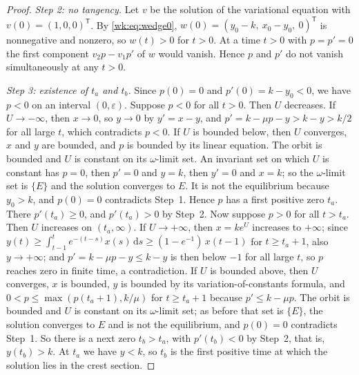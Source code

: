 \begin{proof}
\emph{Step 2: no tangency.} Let $v$ be the solution of the variational equation with $v(0)=(1,0,0)^{\mathsf T}$. By \eqref{wk:eq:wedge0}, $w(0)=(y_0-k,\ x_0-y_0,\ 0)^{\mathsf T}$ is nonnegative and nonzero, so $w(t)>0$ for $t>0$. At a time $t>0$ with $p=p'=0$ the first component $v_2p-v_1p'$ of $w$ would vanish. Hence $p$ and $p'$ do not vanish simultaneously at any $t>0$.

\emph{Step 3: existence of $t_a$ and $t_b$.} Since $p(0)=0$ and $p'(0)=k-y_0<0$, we have $p<0$ on an interval $(0,\varepsilon)$. Suppose $p<0$ for all $t>0$. Then $U$ decreases. If $U\to-\infty$, then $x\to0$, so $y\to0$ by $y'=x-y$, and $p'=k-\mu p-y>k-y>k/2$ for all large $t$, which contradicts $p<0$. If $U$ is bounded below, then $U$ converges, $x$ and $y$ are bounded, and $p$ is bounded by its linear equation. The orbit is bounded and $U$ is constant on its $\omega$-limit set. An invariant set on which $U$ is constant has $p=0$, then $p'=0$ and $y=k$, then $y'=0$ and $x=k$; so the $\omega$-limit set is $\{E\}$ and the solution converges to $E$. It is not the equilibrium because $y_0>k$, and $p(0)=0$ contradicts Step~1. Hence $p$ has a first positive zero $t_a$. There $p'(t_a)\ge0$, and $p'(t_a)>0$ by Step~2. Now suppose $p>0$ for all $t>t_a$. Then $U$ increases on $(t_a,\infty)$. If $U\to+\infty$, then $x=ke^U$ increases to $+\infty$; since $y(t)\ge\int_{t-1}^te^{-(t-s)}x(s)\,\mathrm ds\ge(1-e^{-1})\,x(t-1)$ for $t\ge t_a+1$, also $y\to+\infty$; and $p'=k-\mu p-y\le k-y$ is then below $-1$ for all large $t$, so $p$ reaches zero in finite time, a contradiction. If $U$ is bounded above, then $U$ converges, $x$ is bounded, $y$ is bounded by its variation-of-constants formula, and $0<p\le\max(p(t_a+1),k/\mu)$ for $t\ge t_a+1$ because $p'\le k-\mu p$. The orbit is bounded and $U$ is constant on its $\omega$-limit set; as before that set is $\{E\}$, the solution converges to $E$ and is not the equilibrium, and $p(0)=0$ contradicts Step~1. So there is a next zero $t_b>t_a$, with $p'(t_b)<0$ by Step~2, that is, $y(t_b)>k$. At $t_a$ we have $y<k$, so $t_b$ is the first positive time at which the solution lies in the crest section.


\end{proof}
